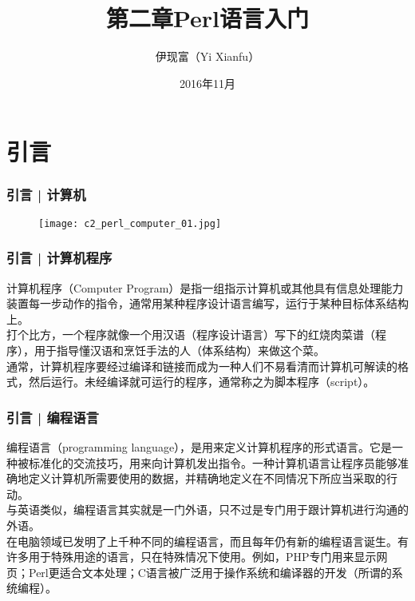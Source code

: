 



\title[Perl语言入门]{第二章\quad Perl语言入门}
\author[Yixf]{伊现富（Yi Xianfu）}
\date{2016年11月}



\section{引言}
\begin{frame}
  \frametitle{引言 | 计算机}
  \begin{figure}
    \centering
    \texttt{[image: c2\_perl\_computer\_01.jpg]}
  \end{figure}
\end{frame}

\begin{frame}
  \frametitle{引言 | 计算机程序}
  计算机程序（Computer Program）是指一组指示计算机或其他具有信息处理能力装置每一步动作的指令，通常用某种程序设计语言编写，运行于某种目标体系结构上。\\
  \vspace{1em}
  打个比方，一个程序就像一个用汉语（程序设计语言）写下的红烧肉菜谱（程序），用于指导懂汉语和烹饪手法的人（体系结构）来做这个菜。\\
  \vspace{1em}
  通常，计算机程序要经过编译和链接而成为一种人们不易看清而计算机可解读的格式，然后运行。未经编译就可运行的程序，通常称之为脚本程序（script）。
\end{frame}

\begin{frame}
  \frametitle{引言 | 编程语言}
编程语言（programming language），是用来定义计算机程序的形式语言。它是一种被标准化的交流技巧，用来向计算机发出指令。一种计算机语言让程序员能够准确地定义计算机所需要使用的数据，并精确地定义在不同情况下所应当采取的行动。\\
  \vspace{1em}
与英语类似，编程语言其实就是一门外语，只不过是专门用于跟计算机进行沟通的外语。\\
  \vspace{1em}
在电脑领域已发明了上千种不同的编程语言，而且每年仍有新的编程语言诞生。有许多用于特殊用途的语言，只在特殊情况下使用。例如，PHP专门用来显示网页；Perl更适合文本处理；C语言被广泛用于操作系统和编译器的开发（所谓的系统编程）。
\end{frame}


